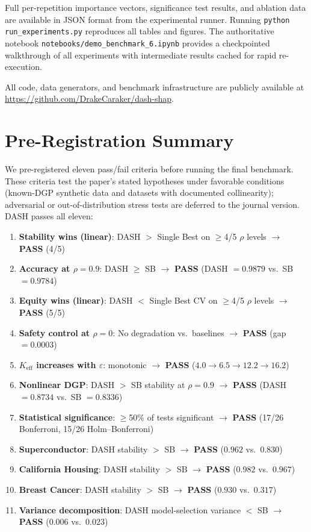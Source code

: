 \documentclass[11pt]{article}
\newcommand{\dash}{\textsc{DASH}}
\newcommand{\rhovar}{\rho}
\begin{document}
Full per-repetition importance vectors, significance test results, and
ablation data are available in JSON format from the experimental runner.
Running \texttt{python run\_experiments.py} reproduces all tables and
figures. The authoritative notebook
\texttt{notebooks/demo\_benchmark\_6.ipynb} provides a checkpointed
walkthrough of all experiments with intermediate results cached for
rapid re-execution.

All code, data generators, and benchmark infrastructure are publicly
available at \url{https://github.com/DrakeCaraker/dash-shap}.

\section{Pre-Registration Summary}
\label{app:criteria}

We pre-registered eleven pass/fail criteria before running the final
benchmark. These criteria test the paper's stated hypotheses under
favorable conditions (known-DGP synthetic data and datasets with
documented collinearity); adversarial or out-of-distribution stress
tests are deferred to the journal version. \dash{} passes all eleven:

\begin{enumerate}
  \item \textbf{Stability wins (linear)}: DASH $>$ Single Best on $\geq$4/5
    $\rhovar$ levels $\to$ \textbf{PASS} (4/5)
  \item \textbf{Accuracy at $\rhovar = 0.9$}: DASH $\geq$ SB $\to$
    \textbf{PASS} (DASH $= 0.9879$ vs.\ SB $= 0.9784$)
  \item \textbf{Equity wins (linear)}: DASH $<$ Single Best CV on $\geq$4/5
    $\rhovar$ levels $\to$ \textbf{PASS} (5/5)
  \item \textbf{Safety control at $\rhovar = 0$}: No degradation vs.\
    baselines $\to$ \textbf{PASS} (gap $= 0.0003$)
  \item \textbf{$K_{\text{eff}}$ increases with $\varepsilon$}: monotonic
    $\to$ \textbf{PASS} ($4.0 \to 6.5 \to 12.2 \to 16.2$)
  \item \textbf{Nonlinear DGP}: DASH $>$ SB stability at $\rhovar = 0.9$
    $\to$ \textbf{PASS} (DASH $= 0.8734$ vs.\ SB $= 0.8336$)
  \item \textbf{Statistical significance}: $\geq$50\% of tests significant
    $\to$ \textbf{PASS} (17/26 Bonferroni, 15/26 Holm--Bonferroni)
  \item \textbf{Superconductor}: DASH stability $>$ SB $\to$ \textbf{PASS}
    ($0.962$ vs.\ $0.830$)
  \item \textbf{California Housing}: DASH stability $>$ SB $\to$ \textbf{PASS}
    ($0.982$ vs.\ $0.967$)
  \item \textbf{Breast Cancer}: DASH stability $>$ SB $\to$ \textbf{PASS}
    ($0.930$ vs.\ $0.317$)
  \item \textbf{Variance decomposition}: DASH model-selection variance $<$ SB
    $\to$ \textbf{PASS} ($0.006$ vs.\ $0.023$)
\end{enumerate}
\end{document}
